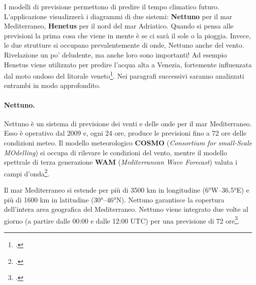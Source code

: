 \documentclass[./main.tex]{subfiles}
\begin{document}

I modelli di previsione permettono di predire il tempo climatico futuro. L'applicazione visualizzerà i diagrammi di due sistemi: \textbf{Nettuno} per il mar Mediterraneo, \textbf{Henetus} per il nord del mar Adriatico. Quando si pensa alle previsioni la prima cosa che viene in mente è se ci sarà il sole o la pioggia. Invece, le due strutture si occupano prevalentemente di onde, Nettuno anche del vento. Rivelazione un po' deludente, ma anche loro sono importanti! Ad esempio Henetus viene utilizzato per predire l'acqua alta a Venezia, fortemente influenzata dal moto ondoso del litorale veneto\footcite[2972-2976]{henetus-wave}. Nei paragrafi successivi saranno analizzati entrambi in modo approfondito.

\paragraph{Nettuno.}

Nettuno è un sistema di previsione dei venti e delle onde per il mar Mediterraneo. Esso è operativo dal 2009 e, ogni 24 ore, produce le previsioni fino a 72 ore delle condizioni meteo. Il modello meteorologico \textbf{COSMO} (\textit{Consortium for small-Scale MOdelling}) si occupa di rilevare le condizioni del vento, mentre il modello spettrale di terza generazione \textbf{WAM} (\textit{Mediterranean Wave Forecast}) valuta i campi d'onda\footcite[\url{https://www.ismar.cnr.it/infrastrutture/modellistica/modelli-operativi/\#2}]{website-ismar-cnr}.\par

Il mar Mediterraneo si estende per più di 3500 km in longitudine (6°W–36.5°E) e più di 1600 km in latitudine (30°–46°N). Nettuno garantisce la copertura dell'intera area geografica del Mediterraneo. Nettuno viene integrato due volte al giorno (a partire dalle 00:00 e dalle 12:00 UTC) per una previsione di 72 ore\footcite[3130-3132]{nettuno-analysis}.\par
\end{document}
